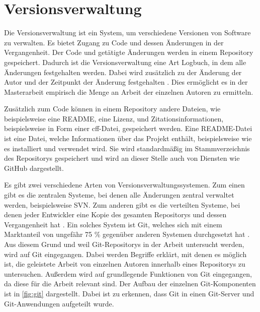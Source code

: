 \section{Versionsverwaltung}
\label{sec:versionsverwaltung}
Die Versionsverwaltung ist ein System, um verschiedene Versionen von Software zu verwalten.
Es bietet Zugang zu Code und dessen Änderungen in der Vergangenheit.
Der Code und getätigte Änderungen werden in einem Repository gespeichert.
Dadurch ist die Versionsverwaltung eine Art Logbuch, in dem alle Änderungen festgehalten werden.
Dabei wird zusätzlich zu der Änderung der Autor und der Zeitpunkt der Änderung festgehalten \autocite{ponuthorai_version_2022}.
Dies ermöglicht es in der Masterarbeit empirisch die Menge an Arbeit der einzelnen Autoren zu ermitteln.

Zusätzlich zum Code können in einem Repository andere Dateien, wie beispielsweise eine README, eine Lizenz, und Zitationsinformationen, beispielsweise in Form einer \gls{cff}-Datei, gespeichert werden.
Eine README-Datei ist eine Datei, welche Informationen über das Projekt enthält, beispielsweise wie es installiert und verwendet wird.
Sie wird standardmäßig im Stammverzeichnis des Repositorys gespeichert und wird an dieser Stelle auch von Diensten wie GitHub dargestellt.

Es gibt zwei verschiedene Arten von Versionsverwaltungssystemen.
Zum einen gibt es die zentralen Systeme, bei denen alle Änderungen zentral verwaltet werden, beispielsweise SVN.
Zum anderen gibt es die verteilten Systeme, bei denen jeder Entwickler eine Kopie des gesamten Repositorys und dessen Vergangenheit hat \autocite{ponuthorai_version_2022}.
Ein solches System ist Git, welches sich mit einem Marktanteil von ungefähr 75 \% gegenüber anderen Systemen durchgesetzt hat \autocite{lindner_version_2024}.
Aus diesem Grund und weil Git-Repositorys in der Arbeit untersucht werden, wird auf Git eingegangen.
Dabei werden Begriffe erklärt, mit denen es möglich ist, die geleistete Arbeit von einzelnen Autoren innerhalb eines Repositorys zu untersuchen.
Außerdem wird auf grundlegende Funktionen von Git eingegangen, da diese für die Arbeit relevant sind.
Der Aufbau der einzelnen Git-Komponenten ist in \autoref{fig:git} dargestellt.
Dabei ist zu erkennen, dass Git in einen Git-Server und Git-Anwendungen aufgeteilt wurde.

